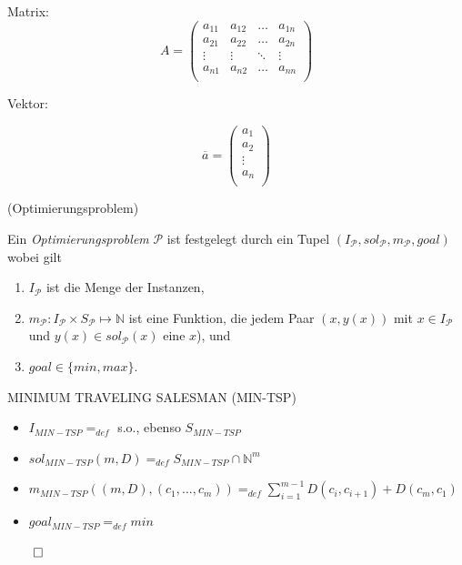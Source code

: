 Matrix:
\begin{equation}
A = \left(
\begin{array}{llll}
a_{11} & a_{12} & \ldots & a_{1n} \\
a_{21} & a_{22} & \ldots & a_{2n} \\
\vdots & \vdots & \ddots & \vdots \\
a_{n1} & a_{n2} & \ldots & a_{nn} \\
\end{array}
\right)
\end{equation}

Vektor: 

\begin{equation}
\overline{a} = \left(
\begin{array}{c}
a_{1}\\
a_{2}\\
\vdots\\
a_{n}\\
\end{array}
\right)
\end{equation}

\begin{definition}(Optimierungsproblem)

Ein \emph{Optimierungsproblem} $\mathcal{P}$ ist festgelegt durch ein Tupel
$(I_\mathcal{P}, sol_\mathcal{P}, m_\mathcal{P}, goal)$ wobei gilt

\begin{enumerate}
\item $I_\mathcal{P}$ ist die Menge der Instanzen,
\item $m_\mathcal{P} : I_\mathcal{P} \times S_\mathcal{P} \longmapsto \mathbb{N}$ ist eine Funktion, die jedem Paar $(x,y(x))$ mit $x \in I_\mathcal{P}$ und $y(x) \in sol_\mathcal{P}(x)$ eine $x$), und
\item $goal \in \{min,max\}$.
\end{enumerate}

\end{definition}

\begin{example} MINIMUM TRAVELING SALESMAN (MIN-TSP)
\begin{itemize}
\item $I_{MIN-TSP} =_{def}$ s.o., ebenso $S_{MIN-TSP}$
\item $sol_{MIN-TSP}(m,D) =_{def} S_{MIN-TSP} \cap \mathbb{N}^m$ 
\item $m_{MIN-TSP}((m,D),(c_1, \ldots , c_m)) =_{def} \sum_{i=1}^{m-1} D(c_i, c_{i+1}) + D(c_m,c_1)$ 
\item $goal_{MIN-TSP} =_{def} min$
\end{itemize}
\begin{flushright}
$\qed$
\end{flushright}
\end{example}

